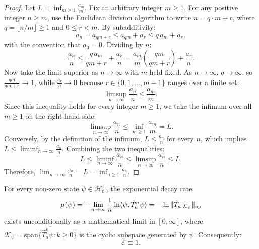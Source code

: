 \begin{proof}
Let $L = \inf_{m \ge 1} \frac{a_m}{m}$. Fix an arbitrary integer $m \ge 1$. For any positive integer $n \ge m$, use the Euclidean division algorithm to write $n = q \cdot m + r$, where $q = \lfloor n/m \rfloor \ge 1$ and $0 \le r < m$. By subadditivity:
\begin{equation}
a_n = a_{q m + r} \le a_{q m} + a_r \le q \, a_m + a_r,
\end{equation}
with the convention that $a_0 = 0$. Dividing by $n$:
\begin{equation}
\frac{a_n}{n} \le \frac{q \, a_m}{q m + r} + \frac{a_r}{n} = \frac{a_m}{m} \left( \frac{q m}{q m + r} \right) + \frac{a_r}{n}.
\end{equation}
Now take the limit superior as $n \to \infty$ with $m$ held fixed. As $n \to \infty$, $q \to \infty$, so $\frac{q m}{q m + r} \to 1$, while $\frac{a_r}{n} \to 0$ because $r \in \{0, 1, \dots, m-1\}$ ranges over a finite set:
\begin{equation}
\limsup_{n \to \infty} \frac{a_n}{n} \le \frac{a_m}{m}.
\end{equation}
Since this inequality holds for every integer $m \ge 1$, we take the infimum over all $m \ge 1$ on the right-hand side:
\begin{equation}
\limsup_{n \to \infty} \frac{a_n}{n} \le \inf_{m \ge 1} \frac{a_m}{m} = L.
\end{equation}
Conversely, by the definition of the infimum, $L \le \frac{a_n}{n}$ for every $n$, which implies $L \le \liminf_{n \to \infty} \frac{a_n}{n}$. Combining the two inequalities:
\begin{equation}
L \le \liminf_{n \to \infty} \frac{a_n}{n} \le \limsup_{n \to \infty} \frac{a_n}{n} \le L.
\end{equation}
Therefore, $\lim_{n \to \infty} \frac{a_n}{n} = L = \inf_{n \ge 1} \frac{a_n}{n}$.
\end{proof}

\begin{corollary}
\label{cor:existence_factor_unity}
For every non-zero state $\psi \in \mathcal{H}_0^\perp$, the exponential decay rate:
\begin{equation}
\label{eq:mu_psi_unconditional}
\mu(\psi) = -\lim_{n \to \infty} \frac{1}{n} \ln \langle \psi, \hat{T}_a^n \psi \rangle = -\ln \|\hat{T}_a|_{\mathcal{K}_\psi}\|_{\mathrm{op}}
\end{equation}
exists unconditionally as a mathematical limit in $[0, \infty]$, where $\mathcal{K}_\psi = \overline{\mathrm{span}\{\hat{T}_a^k \psi : k \ge 0\}}$ is the cyclic subspace generated by $\psi$. Consequently:
\begin{equation}
\label{eq:existence_factor_is_one}
\mathcal{E} \equiv 1.
\end{equation}
\end{corollary}


